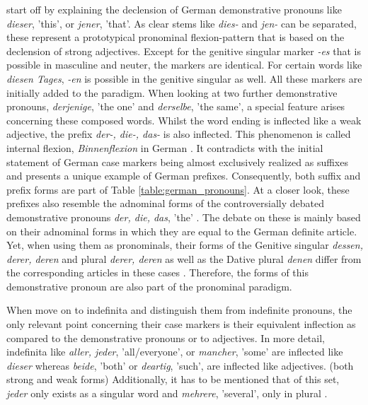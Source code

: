 \documentclass[11pt,a4paper,twoside,openright]{scrbook}
\begin{document}
\citet{thieroff2012ger} start off by explaining the declension of German demonstrative pronouns like \textit{dieser}, 'this', or \textit{jener}, 'that'. As clear stems like \textit{dies-} and \textit{jen-} can be separated, these represent a prototypical pronominal flexion-pattern that is based on the declension of strong adjectives. Except for the genitive singular marker \textit{-es} that is possible in masculine and neuter, the markers are identical. For certain words like \textit{diesen Tages}, \textit{-en} is possible in the genitive singular as well. All these markers are initially added to the paradigm. When looking at two further demonstrative pronouns, \textit{derjenige}, 'the one' and \textit{derselbe}, 'the same', a special feature arises concerning these composed words.  Whilst the word ending is inflected  like a weak adjective, the prefix \textit{der-, die-, das-} is also inflected. This phenomenon is called internal flexion, \textit{Binnenflexion} in German \citep{thieroff2012ger}. It contradicts with the initial statement of German case markers being almost exclusively realized as suffixes and presents a unique example of German prefixes. Consequently, both suffix and prefix forms are part of Table \ref{table:german_pronouns}. At a closer look, these prefixes also resemble the adnominal forms of the controversially debated demonstrative pronouns \textit{der, die, das}, 'the' \citep{thieroff2012ger}. The debate on these is mainly based on their adnominal forms in which they are equal to the German definite article. Yet, when using them as pronominals, their forms of the Genitive singular \textit{dessen, derer, deren} and plural \textit{derer, deren} as well as the Dative plural \textit{denen} differ from the corresponding articles in these cases \citep{thieroff2012ger}. Therefore, the forms of this demonstrative pronoun are also part of the pronominal paradigm.

When \citet{thieroff2012ger} move on to indefinita and distinguish them from indefinite pronouns, the only relevant point concerning their case markers is their equivalent inflection as compared to the demonstrative pronouns or to adjectives. In more detail, indefinita like \textit{aller, jeder}, 'all/everyone', or \textit{mancher}, 'some' are inflected like \textit{dieser} whereas \textit{beide}, 'both' or \textit{deartig}, 'such', are inflected like adjectives. (both strong and weak forms)
Additionally, it has to be mentioned that of this set, \textit{jeder} only exists as a singular word and \textit{mehrere}, 'several', only in plural \citep{thieroff2012ger}.
\end{document}

